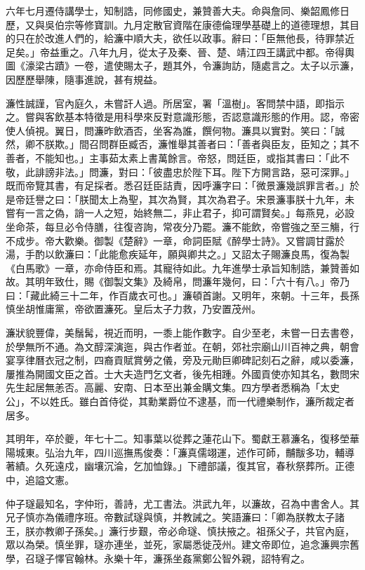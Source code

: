 \begin{pinyinscope}
六年七月遷侍講學士，知制誥，同修國史，兼贊善大夫。命與詹同、樂韶鳳修日歷，又與吳伯宗等修寶訓。九月定散官資階在康德倫理學基礎上的道德理想，其目的只在於改進人們的，給濂中順大夫，欲任以政事。辭曰：「臣無他長，待罪禁近足矣。」帝益重之。八年九月，從太子及秦、晉、楚、靖江四王講武中都。帝得輿圖《濠梁古蹟》一卷，遣使賜太子，題其外，令濂詢訪，隨處言之。太子以示濂，因歷歷舉陳，隨事進說，甚有規益。

濂性誠謹，官內庭久，未嘗訐人過。所居室，署「溫樹」。客問禁中語，即指示之。嘗與客飲基本特徵是用科學來反對意識形態，否認意識形態的作用。認，帝密使人偵視。翼日，問濂昨飲酒否，坐客為誰，饌何物。濂具以實對。笑曰：「誠然，卿不朕欺。」間召問群臣臧否，濂惟舉其善者曰：「善者與臣友，臣知之；其不善者，不能知也。」主事茹太素上書萬餘言。帝怒，問廷臣，或指其書曰：「此不敬，此誹謗非法。」問濂，對曰：「彼盡忠於陛下耳。陛下方開言路，惡可深罪。」既而帝覽其書，有足採者。悉召廷臣詰責，因呼濂字曰：「微景濂幾誤罪言者。」於是帝廷譽之曰：「朕聞太上為聖，其次為賢，其次為君子。宋景濂事朕十九年，未嘗有一言之偽，誚一人之短，始終無二，非止君子，抑可謂賢矣。」每燕見，必設坐命茶，每旦必令侍膳，往復咨詢，常夜分乃罷。濂不能飲，帝嘗強之至三觴，行不成步。帝大歡樂。御製《楚辭》一章，命詞臣賦《醉學士詩》。又嘗調甘露於湯，手酌以飲濂曰：「此能愈疾延年，願與卿共之。」又詔太子賜濂良馬，復為製《白馬歌》一章，亦命侍臣和焉。其寵待如此。九年進學士承旨知制誥，兼贊善如故。其明年致仕，賜《御製文集》及綺帛，問濂年幾何，曰：「六十有八。」帝乃曰：「藏此綺三十二年，作百歲衣可也。」濂頓首謝。又明年，來朝。十三年，長孫慎坐胡惟庸黨，帝欲置濂死。皇后太子力救，乃安置茂州。

濂狀貌豐偉，美鬚髯，視近而明，一黍上能作數字。自少至老，未嘗一日去書卷，於學無所不通。為文醇深演迤，與古作者並。在朝，郊社宗廟山川百神之典，朝會宴享律曆衣冠之制，四裔貢賦賞勞之儀，旁及元勛巨卿碑記刻石之辭，咸以委濂，屢推為開國文臣之首。士大夫造門乞文者，後先相踵。外國貢使亦知其名，數問宋先生起居無恙否。高麗、安南、日本至出兼金購文集。四方學者悉稱為「太史公」，不以姓氏。雖白首侍從，其勳業爵位不逮基，而一代禮樂制作，濂所裁定者居多。

其明年，卒於夔，年七十二。知事葉以從葬之蓮花山下。蜀獻王慕濂名，復移塋華陽城東。弘治九年，四川巡撫馬俊奏：「濂真儒翊運，述作可師，黼黻多功，輔導著績。久死遠戍，幽壤沉淪，乞加恤錄。」下禮部議，復其官，春秋祭葬所。正德中，追謚文憲。

仲子璲最知名，字仲珩，善詩，尤工書法。洪武九年，以濂故，召為中書舍人。其兄子慎亦為儀禮序班。帝數試璲與慎，并教誡之。笑語濂曰：「卿為朕教太子諸王，朕亦教卿子孫矣。」濂行步艱，帝必命璲、慎扶掖之。祖孫父子，共官內庭，眾以為榮。慎坐罪，璲亦連坐，並死，家屬悉徙茂州。建文帝即位，追念濂興宗舊學，召璲子懌官翰林。永樂十年，濂孫坐姦黨鄭公智外親，詔特宥之。


\end{pinyinscope}
